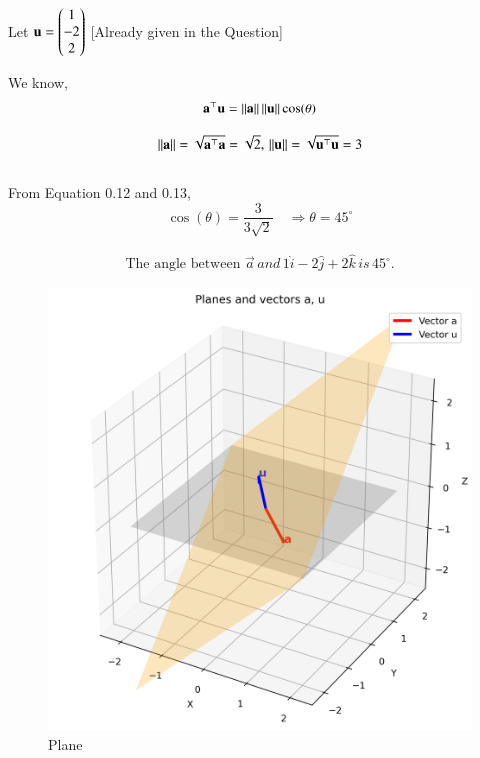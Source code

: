 \documentclass[journal]{IEEEtran}
\begin{document}
Let $\mathbf{u} = \begin{pmatrix}1 \\ -2 \\ 2\end{pmatrix}$ [Already given in the Question]

We know,
\begin{equation}
    \mathbf{a}^\top\mathbf{u} = \left\lVert\mathbf{a}\right\rVert\left\lVert\mathbf{u}\right\rVert\cos(\theta)
\end{equation}

\begin{equation}
    \left\lVert\mathbf{a}\right\rVert = \sqrt{\mathbf{a}^\top\mathbf{a}} = \sqrt{2}, \, \left\lVert\mathbf{u}\right\rVert = \sqrt{\mathbf{u}^\top\mathbf{u}} = 3
\end{equation}\\

From Equation 0.12 and 0.13,
\begin{equation}
    \cos(\theta) = \dfrac{3}{3\sqrt{2}} \quad \Rightarrow \theta = 45^\circ
\end{equation}

\begin{align}
  \boxed{\text{The angle between } \vec{a} \, and \, 1\hat{i} -2\hat{j}+2\hat{k} \, is \, 45^{\circ}.}  
\end{align}

\begin{figure}[htbp]
    \centering
    \includegraphics[width=\columnwidth]{figs/fig1.png}
    \caption{Plane}
    \label{fig:fig/fig1.png}
\end{figure}
\end{document}
